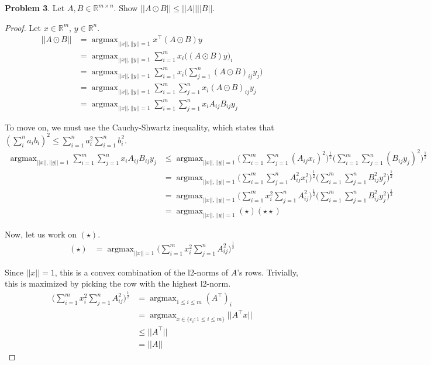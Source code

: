 \documentclass[a4paper]{article}
\DeclareMathOperator*{\argmax}{argmax}
\begin{document}
\textbf{Problem 3}. Let $A, B \in \mathbb{R}^{m \times n}$. Show $||A \odot B|| \leq ||A|| ||B||$. \\

\begin{proof}

Let $x \in \mathbb{R}^m$, $y \in \mathbb{R}^n$.
\begin{align*}
    ||A \odot B|| &= \argmax_{||x||,||y||=1} x^\intercal (A \odot B) y \\
                  &= \argmax_{||x||,||y||=1} \sum_{i=1}^m x_i \Big((A \odot B) y \Big)_i \\
                  &= \argmax_{||x||,||y||=1} \sum_{i=1}^m x_i \Big( \sum_{j=1}^n (A \odot B)_{ij} y_j \Big) \\
                  &= \argmax_{||x||,||y||=1} \sum_{i=1}^m \sum_{j=1}^n x_i (A \odot B)_{ij} y_j \\
                  &= \argmax_{||x||,||y||=1} \sum_{i=1}^m \sum_{j=1}^n x_i A_{ij} B_{ij} y_j
\end{align*}

To move on, we must use the Cauchy-Shwartz inequality, which states that $(\sum_{i}^{n} a_i b_i)^2 \leq \sum_{i=1}^n a_i^2 \sum_{i=1}^n b_i^2$.
\begin{align*}
    \argmax_{||x||,||y||=1} \sum_{i=1}^m \sum_{j=1}^n x_i A_{ij} B_{ij} y_j
    &\leq \argmax_{||x||,||y||=1}
    \Big( \sum_{i=1}^m \sum_{j=1}^n (A_{ij} x_i)^2 \Big)^\frac{1}{2}
    \Big( \sum_{i=1}^m \sum_{j=1}^n (B_{ij} y_j)^2 \Big)^\frac{1}{2} \\
    &= \argmax_{||x||,||y||=1}
    \Big( \sum_{i=1}^m \sum_{j=1}^n A_{ij}^2 x_i^2 \Big)^\frac{1}{2}
    \Big( \sum_{i=1}^m \sum_{j=1}^n B_{ij}^2 y_j^2 \Big)^\frac{1}{2} \\
    &= \argmax_{||x||,||y||=1}
    \Big( \sum_{i=1}^m x_i^2 \sum_{j=1}^n A_{ij}^2 \Big)^\frac{1}{2}
    \Big( \sum_{i=1}^m \sum_{j=1}^n B_{ij}^2 y_j^2 \Big)^\frac{1}{2} \\
    &= \argmax_{||x||,||y||=1}
    (\star)
    (\star \star)
\end{align*}

Now, let us work on $(\star)$.
\begin{align*}
    (\star) &= \argmax_{||x|| = 1}
    \Big( \sum_{i=1}^m x_i^2 \sum_{j=1}^n A_{ij}^2 \Big)^\frac{1}{2}
\end{align*}

Since $||x|| = 1$, this is a convex combination of the l2-norms of $A$'s rows. Trivially, this is maximized by picking the row with the highest l2-norm.
\begin{align*}
    \Big( \sum_{i=1}^m x_i^2 \sum_{j=1}^n A_{ij}^2 \Big)^\frac{1}{2} &= \argmax_{1 \leq i \leq m} (A^\intercal)_i \\
                                                                     &= \argmax_{x \in \{e_i : 1 \leq i \leq m \}} ||A^\intercal x|| \\
                                                                     &\leq ||A^\intercal|| \\
                                                                     &= ||A||
\end{align*}


\end{proof}
\end{document}
